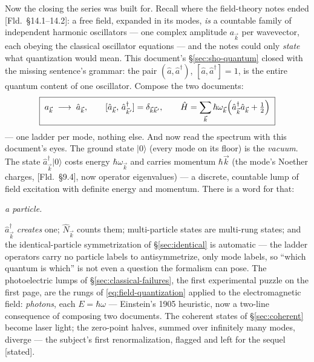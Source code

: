 \documentclass[11pt]{article}
\theoremstyle{plain}
\theoremstyle{definition}
\theoremstyle{remark}
\newcommand{\op}[1]{\hat{#1}}
\newcommand{\ket}[1]{\lvert #1 \rangle}
\begin{document}
Now the closing the series was built for. Recall where the
field-theory notes ended [Fld.\ \S14.1--14.2]: a free field,
expanded in its modes, \emph{is} a countable family of independent
harmonic oscillators --- one complex amplitude $a_{\vec k}$ per
wavevector, each obeying the classical oscillator equations --- and
the notes could only \emph{state} what quantization would mean.
This document's \S\ref{sec:sho-quantum} closed with the missing
sentence's grammar: the pair $(\op a, \op a^\dagger)$,
$[\op a, \op a^\dagger] = 1$, is the entire quantum content of one
oscillator. Compose the two documents:
\begin{equation}
  \boxed{\;
  a_{\vec k} \;\longrightarrow\; \op a_{\vec k},
  \qquad
  [\op a_{\vec k},\, \op a^\dagger_{\vec k'}]
  = \delta_{\vec k \vec k'},
  \qquad
  \op H
  = \sum_{\vec k} \hbar\omega_{\vec k}
    \Bigl(\op a^\dagger_{\vec k}\op a_{\vec k} + \tfrac12\Bigr)
  \;}
  \label{eq:field-quantization}
\end{equation}
--- one ladder per mode, nothing else. And now read the spectrum
with this document's eyes. The ground state $\ket 0$ (every mode on
its floor) is the \emph{vacuum}. The state
$\op a^\dagger_{\vec k}\ket 0$ costs energy $\hbar\omega_{\vec k}$
and carries momentum $\hbar\vec k$ (the mode's Noether charges,
[Fld.\ \S9.4], now operator eigenvalues) --- a discrete, countable
lump of field excitation with definite energy and momentum. There
is a word for that:
\begin{center}
\emph{a particle.}
\end{center}
$\op a^\dagger_{\vec k}$ \emph{creates} one; $\op N_{\vec k}$
counts them; multi-particle states are multi-rung states; and the
identical-particle symmetrization of \S\ref{sec:identical} is
automatic --- the ladder operators carry no particle labels to
antisymmetrize, only mode labels, so ``which quantum is which'' is
not even a question the formalism can pose. The photoelectric lumps
of \S\ref{sec:classical-failures}, the first experimental puzzle on
the first page, are the rungs of \eqref{eq:field-quantization}
applied to the electromagnetic field: \emph{photons}, each
$E = \hbar\omega$ --- Einstein's 1905 heuristic, now a two-line
consequence of composing two documents. The coherent states of
\S\ref{sec:coherent} become laser light; the zero-point halves,
summed over infinitely many modes, diverge --- the subject's first
renormalization, flagged and left for the sequel [stated].
\end{document}
